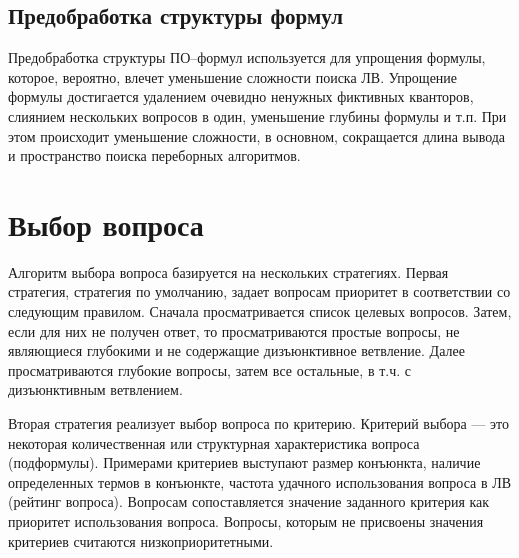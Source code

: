 \subsection{Предобработка структуры формул}
Предобработка структуры ПО--формул используется для упрощения формулы, которое, вероятно, влечет уменьшение сложности поиска ЛВ. Упрощение формулы достигается удалением очевидно ненужных фиктивных кванторов, слиянием нескольких вопросов в один, уменьшение глубины формулы и т.п. При этом происходит уменьшение сложности, в основном, сокращается длина вывода и пространство поиска переборных алгоритмов.




\section{Выбор вопроса} %
Алгоритм выбора вопроса базируется на нескольких стратегиях. Первая стратегия, стратегия по умолчанию, задает вопросам приоритет в соответствии со следующим правилом. Сначала просматривается список целевых вопросов. Затем, если для них не получен ответ, то просматриваются простые вопросы, не являющиеся глубокими и не содержащие дизъюнктивное ветвление. Далее просматриваются глубокие вопросы, затем все остальные, в т.ч. с дизъюнктивным ветвлением.

Вторая стратегия реализует выбор вопроса по критерию. Критерий выбора --- это некоторая количественная или структурная характеристика вопроса (подформулы). Примерами критериев выступают размер конъюнкта, наличие определенных термов в конъюнкте, частота удачного использования вопроса в ЛВ (рейтинг вопроса). Вопросам сопоставляется значение заданного критерия как приоритет использования вопроса. Вопросы, которым не присвоены значения критериев считаются низкоприоритетными. %





